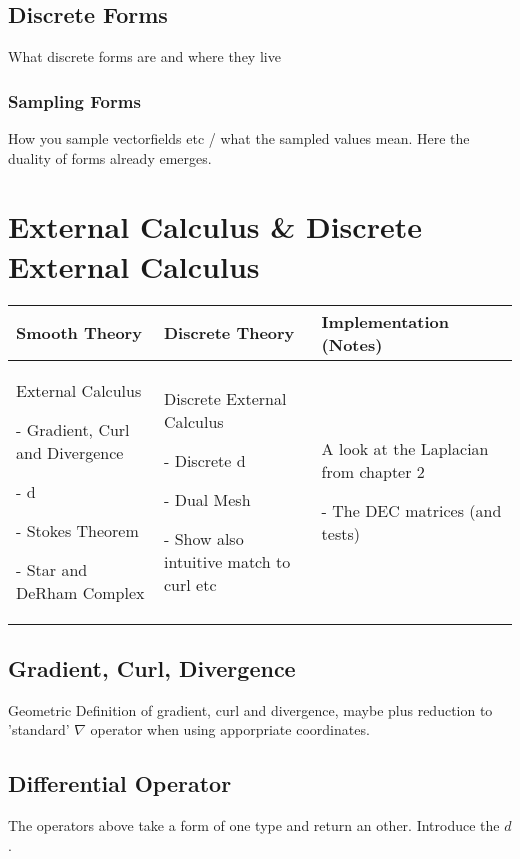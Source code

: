 \documentclass{scrartcl}
\newenvironment{packed_enum}{
\begin{enumerate}
  \setlength{\itemsep}{1pt}
  \setlength{\parskip}{0pt}
  \setlength{\parsep}{0pt}
}{\end{enumerate}}
\begin{document}
	\subsection{Discrete Forms}
		What discrete forms are and where they live
	\subsubsection{Sampling Forms}
		How you sample vectorfields etc / what the sampled values mean. Here the duality of forms already emerges.
	
\newpage		
\section{External Calculus \& Discrete External Calculus}
	\begin{longtable}{|p{4.5cm}|p{4.5cm}|p{4.5cm}|}
		\hline
		Smooth Theory& Discrete Theory& Implementation (Notes)\\
		\hline
			External Calculus
			\begin{packed_enum}
				\item[-] Gradient, Curl and Divergence
				\item[-] d
				\item[-] Stokes Theorem
				\item[-] Star and DeRham Complex
			\end{packed_enum}
			&
			Discrete External Calculus
			\begin{packed_enum}
				\item[-] Discrete d
				\item[-] Dual Mesh
				\item[-] Show also intuitive match to curl etc
			\end{packed_enum}
			 & 
			 A look at the Laplacian from chapter 2
			 \begin{packed_enum}
				\item[-] The DEC matrices (and tests)
			\end{packed_enum}
			 \\		
		\hline
	\end{longtable}
	\subsection{Gradient, Curl, Divergence}
		Geometric Definition of gradient, curl and divergence, maybe plus reduction to 'standard' $\nabla$ operator when using apporpriate coordinates.
	\subsection{Differential Operator}
		The operators above take a form of one type and return an other.
		Introduce the $d$.
\end{document}
